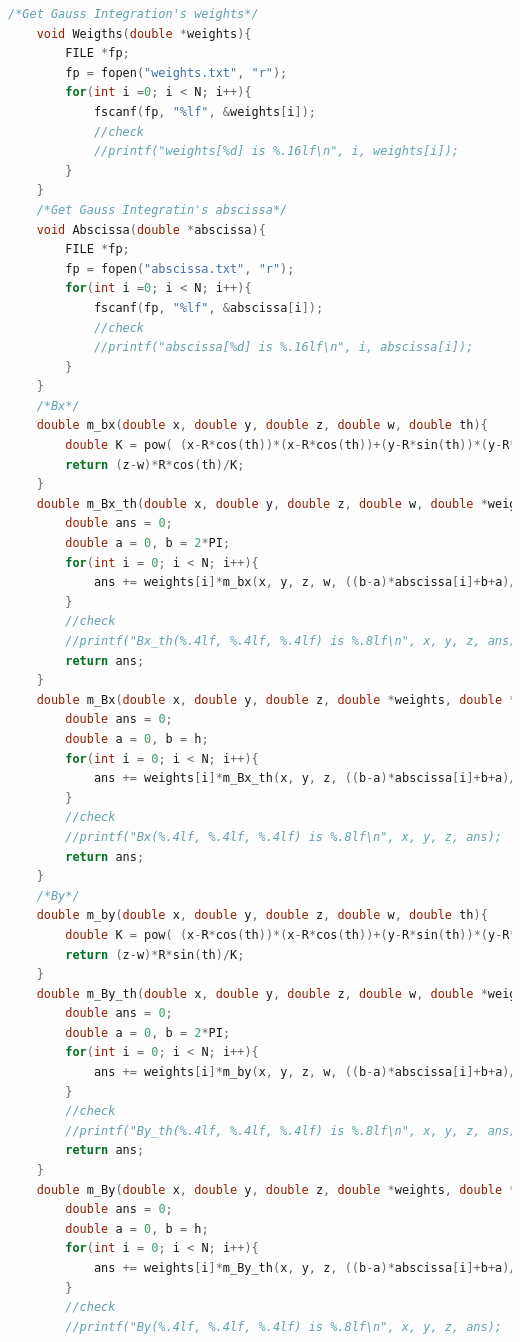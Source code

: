\documentclass[AutoFakeBold]{LZUThesis}
\begin{document}
\begin{lstlisting}[language = C]
    /*Get Gauss Integration's weights*/
    void Weigths(double *weights){
        FILE *fp;
        fp = fopen("weights.txt", "r");
        for(int i =0; i < N; i++){
            fscanf(fp, "%lf", &weights[i]);
            //check
            //printf("weights[%d] is %.16lf\n", i, weights[i]);
        }
    }
    /*Get Gauss Integratin's abscissa*/
    void Abscissa(double *abscissa){
        FILE *fp;
        fp = fopen("abscissa.txt", "r");
        for(int i =0; i < N; i++){
            fscanf(fp, "%lf", &abscissa[i]);
            //check
            //printf("abscissa[%d] is %.16lf\n", i, abscissa[i]);
        }
    }
    /*Bx*/
    double m_bx(double x, double y, double z, double w, double th){
        double K = pow( (x-R*cos(th))*(x-R*cos(th))+(y-R*sin(th))*(y-R*sin(th))+(z-w)*(z-w) , 1.5);
        return (z-w)*R*cos(th)/K;
    }
    double m_Bx_th(double x, double y, double z, double w, double *weights, double *abscissa){
        double ans = 0;
        double a = 0, b = 2*PI;
        for(int i = 0; i < N; i++){
            ans += weights[i]*m_bx(x, y, z, w, ((b-a)*abscissa[i]+b+a)/2)*(b-a)/2;
        }
        //check
        //printf("Bx_th(%.4lf, %.4lf, %.4lf) is %.8lf\n", x, y, z, ans);
        return ans;
    }
    double m_Bx(double x, double y, double z, double *weights, double *abscissa){
        double ans = 0;
        double a = 0, b = h;
        for(int i = 0; i < N; i++){
            ans += weights[i]*m_Bx_th(x, y, z, ((b-a)*abscissa[i]+b+a)/2, weights, abscissa)*(b-a)/2;
        }
        //check
        //printf("Bx(%.4lf, %.4lf, %.4lf) is %.8lf\n", x, y, z, ans);
        return ans;
    }
    /*By*/
    double m_by(double x, double y, double z, double w, double th){
        double K = pow( (x-R*cos(th))*(x-R*cos(th))+(y-R*sin(th))*(y-R*sin(th))+(z-w)*(z-w) , 1.5);
        return (z-w)*R*sin(th)/K;
    }
    double m_By_th(double x, double y, double z, double w, double *weights, double *abscissa){
        double ans = 0;
        double a = 0, b = 2*PI;
        for(int i = 0; i < N; i++){
            ans += weights[i]*m_by(x, y, z, w, ((b-a)*abscissa[i]+b+a)/2)*(b-a)/2;
        }
        //check
        //printf("By_th(%.4lf, %.4lf, %.4lf) is %.8lf\n", x, y, z, ans);
        return ans;
    }
    double m_By(double x, double y, double z, double *weights, double *abscissa){
        double ans = 0;
        double a = 0, b = h;
        for(int i = 0; i < N; i++){
            ans += weights[i]*m_By_th(x, y, z, ((b-a)*abscissa[i]+b+a)/2, weights, abscissa)*(b-a)/2;
        }
        //check
        //printf("By(%.4lf, %.4lf, %.4lf) is %.8lf\n", x, y, z, ans);

\end{lstlisting}
\end{document}
